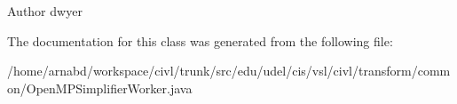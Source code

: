 \begin{DoxyAuthor}{Author}
dwyer 
\end{DoxyAuthor}


The documentation for this class was generated from the following file\+:\begin{DoxyCompactItemize}
\item 
/home/arnabd/workspace/civl/trunk/src/edu/udel/cis/vsl/civl/transform/common/Open\+M\+P\+Simplifier\+Worker.\+java\end{DoxyCompactItemize}
